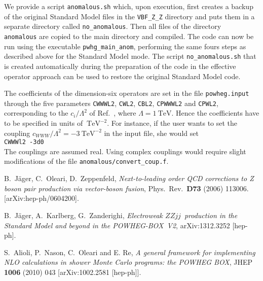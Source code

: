 \documentclass[a4paper,11pt]{article}
\def\mr{\mathrm}
\begin{document}
We provide a script {\tt anomalous.sh} which, upon execution, first creates a backup of the original Standard Model files
in the {\tt VBF\_Z\_Z} directory and puts them in a separate directory
called {\tt no\_anomalous}. Then all files of the directory {\tt
  anomalous} are copied to the main directory and compiled.  The
code can now be run using the executable {\tt pwhg\_main\_anom}, performing the same fours steps as described above for the Standard Model mode. 
%
The script  {\tt no\_anomalous.sh} that is created automatically during the preparation of the code in the effective operator approach can be used to restore the original Standard Model code. 


The coefficients of the dimension-six operators are set in the file {\tt powheg.input} through the
five parameters {\tt CWWWL2}, {\tt CWL2}, {\tt CBL2}, {\tt CPWWWL2} and
{\tt CPWL2}, corresponding to the 
$c_{i}/\Lambda^2$ of Ref.~\cite{JKZ}, 
where $\Lambda=1~\mr{TeV}$. Hence the
coefficients have to be specified in units of $~\mr{TeV}^{-2}$. For instance, if the user
wants to set the coupling
$c_{WWW}/\Lambda^{2}=-3~\mr{TeV}^{-2}$ 
in the input file, she
would set
\\[2ex]
{\tt CWWWl2 \qquad -3d0}
\\[2ex]
The couplings are assumed real. Using complex couplings would require slight modifications 
of the file {\tt anomalous/convert\_coup.f}.


%
\begin{thebibliography}{99}
  B.~J\"ager, C.~Oleari, D.~Zeppenfeld, 
{\it Next-to-leading order QCD corrections to Z boson pair production via vector-boson fusion},
  Phys.\ Rev.\  {\bf D73 } (2006)  113006.
  [arXiv:hep-ph/0604200].

 B.~J\"ager, A.~Karlberg, G.~Zanderighi, {\em 
Electroweak $ZZjj$~production in the
  Standard Model and beyond in the POWHEG-BOX~V2}, arXiv:1312.3252 [hep-ph].
  
 S.~Alioli, P.~Nason, C.~Oleari and E. Re, {\em
    A general framework for implementing NLO calculations in shower
    Monte Carlo programs: the POWHEG BOX}, JHEP {\bf 1006} (2010)
  043  [arXiv:1002.2581 [hep-ph]].

\end{thebibliography}
\end{document}
